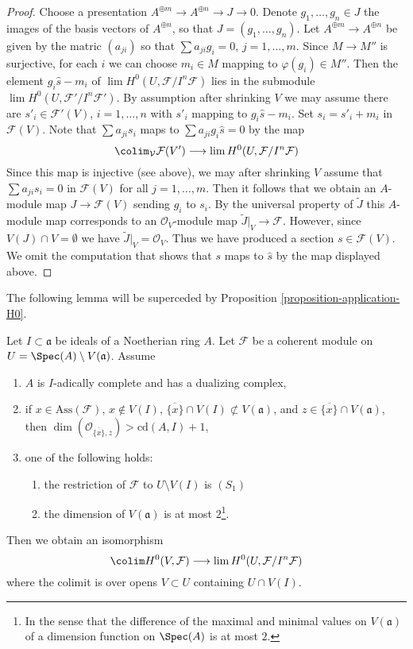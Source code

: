 \begin{proof}
\medskip\noindent
Choose a presentation $A^{\oplus m} \to A^{\oplus n} \to J \to 0$.
Denote $g_1, \ldots, g_n \in J$ the images of the basis vectors
of $A^{\oplus n}$, so that $J = (g_1, \ldots, g_n)$. Let
$A^{\oplus m} \to A^{\oplus n}$ be given by the matric $(a_{ji})$
so that $\sum a_{ji} g_i = 0$, $j = 1, \ldots, m$.
Since $M \to M''$ is surjective, for each $i$ we can choose $m_i \in M$
mapping to $\varphi(g_i) \in M''$. Then the element $g_i \hat s - m_i$
of $\lim H^0(U, \mathcal{F}/I^n\mathcal{F})$ lies in
the submodule $\lim H^0(U, \mathcal{F}'/I^n\mathcal{F}')$.
By assumption after shrinking $V$ we may assume there are
$s'_i \in \mathcal{F}'(V)$, $i = 1, \ldots, n$
with $s'_i$ mapping to $g_i \hat s - m_i$.
Set $s_i = s'_i + m_i$ in $\mathcal{F}(V)$.
Note that $\sum a_{ji} s_i$ maps to $\sum a_{ji}g_i\hat s = 0$
by the map
$$
\colim_\mathcal{V} \mathcal{F}(V')
\longrightarrow
\lim H^0(U, \mathcal{F}/I^n\mathcal{F})
$$
Since this map is injective (see above), we may after shrinking $V$ assume
that $\sum a_{ji}s_i = 0$ in $\mathcal{F}(V)$ for all $j = 1, \ldots, m$.
Then it follows that we obtain an $A$-module map $J \to \mathcal{F}(V)$
sending $g_i$ to $s_i$. By the universal property of $\widetilde{J}$
this $A$-module map corresponds to an $\mathcal{O}_V$-module map
$\widetilde{J}|_V \to \mathcal{F}$. However, since $V(J) \cap V = \emptyset$
we have $\widetilde{J}|_V = \mathcal{O}_V$. Thus we have produced
a section $s \in \mathcal{F}(V)$. We omit the computation that
shows that $s$ maps to $\hat s$ by the map displayed above.
\end{proof}

\noindent
The following lemma will be superceded by
Proposition \ref{proposition-application-H0}.

\begin{lemma}
\label{lemma-application-H0-pre}
Let $I \subset \mathfrak a$ be ideals of a Noetherian ring $A$.
Let $\mathcal{F}$ be a coherent module on
$U = \Spec(A) \setminus V(\mathfrak a)$.
Assume
\begin{enumerate}
\item $A$ is $I$-adically complete and has a dualizing complex,
\item if $x \in \text{Ass}(\mathcal{F})$, $x \not \in V(I)$,
$\overline{\{x\}} \cap V(I) \not \subset V(\mathfrak a)$,
and $z \in \overline{\{x\}} \cap V(\mathfrak a)$, then
$\dim(\mathcal{O}_{\overline{\{x\}}, z}) > \text{cd}(A, I) + 1$,
\item one of the following holds:
\begin{enumerate}
\item the restriction of $\mathcal{F}$ to $U \setminus V(I)$ is $(S_1)$
\item the dimension of $V(\mathfrak a)$ is at most $2$\footnote{In
the sense that the difference of the maximal and minimal values
on $V(\mathfrak a)$ of a dimension function on $\Spec(A)$ is at most $2$.}.
\end{enumerate}
\end{enumerate}
Then we obtain an isomorphism
$$
\colim H^0(V, \mathcal{F})
\longrightarrow
\lim H^0(U, \mathcal{F}/I^n\mathcal{F})
$$
where the colimit is over opens $V \subset U$ containing $U \cap V(I)$.
\end{lemma}

